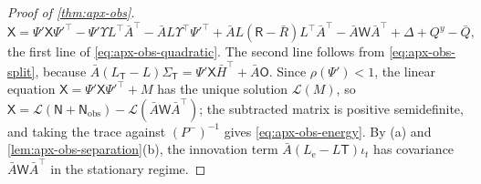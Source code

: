 \begin{proof}[Proof of \cref{thm:apx-obs}]
\begin{equation*}
\mathsf X=\Psi'\mathsf X\Psi'^\top-\Psi'\Upsilon L^\top\bar A^\top-\bar AL\Upsilon^\top\Psi'^\top+\bar AL(\mathsf R-\bar R)L^\top\bar A^\top-\bar A\mathsf W\bar A^\top+\Delta+Q^y-\bar Q ,
\end{equation*}
the first line of \eqref{eq:apx-obs-quadratic}. The second line follows from \eqref{eq:apx-obs-split}, because $\bar A(L_{\mathsf T}-L)\Sigma_{\mathsf T}=\Psi'\mathsf X\bar H^\top+\bar A\mathsf O$. Since $\rho(\Psi')<1$, the linear equation $\mathsf X=\Psi'\mathsf X\Psi'^\top+M$ has the unique solution $\mathcal L(M)$, so $\mathsf X=\mathcal L(\mathsf N+\mathsf N_{\mathrm{obs}})-\mathcal L(\bar A\mathsf W\bar A^\top)$; the subtracted matrix is positive semidefinite, and taking the trace against $(P^-)^{-1}$ gives \eqref{eq:apx-obs-energy}. By (a) and \cref{lem:apx-obs-separation}(b), the innovation term $\bar A(L_{\mathrm e}-L\mathsf T)\iota_t$ has covariance $\bar A\mathsf W\bar A^\top$ in the stationary regime.


\end{proof}

